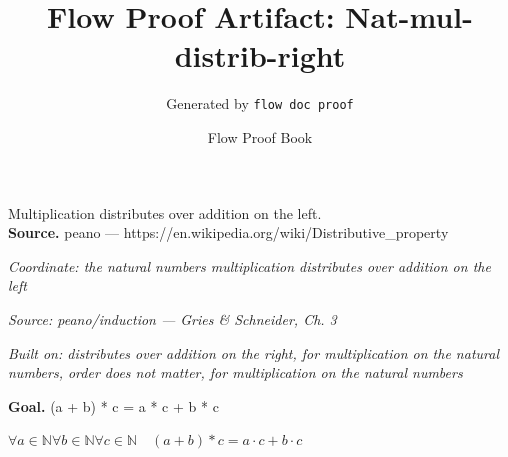 \documentclass[11pt]{article}
\title{Flow Proof Artifact: Nat-mul-distrib-right}
\author{Generated by \texttt{flow doc proof}}
\date{Flow Proof Book}
\theoremstyle{definition}
\begin{document}
\maketitle
Multiplication distributes over addition on the left.\\[0.5em]
\textbf{Source.} peano — https://en.wikipedia.org/wiki/Distributive\_property\\[0.5em]
\bigskip
{}\par
\smallskip\noindent\textit{Coordinate: the natural numbers \cdot multiplication \cdot distributes over addition on the left}\par
\smallskip\noindent\textit{Source: peano/induction — Gries \& Schneider, Ch. 3}\par
\smallskip\noindent\textit{Built on: distributes over addition on the right, for multiplication on the natural numbers, order does not matter, for multiplication on the natural numbers}\par
\medskip
\noindent\textbf{Goal.} (a + b) * c = a * c + b * c\par
\noindent$\displaystyle \forall a \in \mathbb{N} \forall b \in \mathbb{N} \forall c \in \mathbb{N}\quad (a + b) * c = a \cdot c + b \cdot c$\par
\medskip
\noindent
\end{document}
